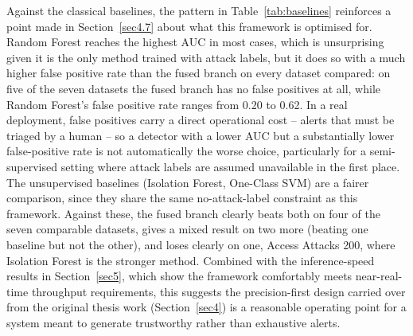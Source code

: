 \documentclass[futureinternet,article,submit,moreauthors]{Definitions/mdpi}
\begin{document}
Against the classical baselines, the pattern in Table~\ref{tab:baselines} reinforces a point made in Section~\ref{sec4.7} about what this framework is optimised for. Random Forest reaches the highest AUC in most cases, which is unsurprising given it is the only method trained with attack labels, but it does so with a much higher false positive rate than the fused branch on every dataset compared: on five of the seven datasets the fused branch has no false positives at all, while Random Forest's false positive rate ranges from 0.20 to 0.62. In a real deployment, false positives carry a direct operational cost -- alerts that must be triaged by a human -- so a detector with a lower AUC but a substantially lower false-positive rate is not automatically the worse choice, particularly for a semi-supervised setting where attack labels are assumed unavailable in the first place. The unsupervised baselines (Isolation Forest, One-Class SVM) are a fairer comparison, since they share the same no-attack-label constraint as this framework. Against these, the fused branch clearly beats both on four of the seven comparable datasets, gives a mixed result on two more (beating one baseline but not the other), and loses clearly on one, Access Attacks 200, where Isolation Forest is the stronger method. Combined with the inference-speed results in Section~\ref{sec5}, which show the framework comfortably meets near-real-time throughput requirements, this suggests the precision-first design carried over from the original thesis work (Section~\ref{sec4}) is a reasonable operating point for a system meant to generate trustworthy rather than exhaustive alerts.
\end{document}
